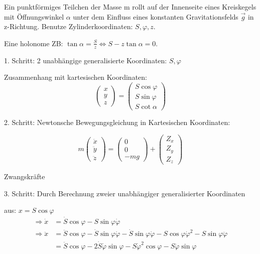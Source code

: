 \documentclass[10pt, letterpaper]{article}
\begin{document}
Ein punktförmiges Teilchen der Masse m rollt auf der Innenseite eines Kreiskegels mit Öffnungswinkel $\alpha$ unter dem Einfluss eines konstanten Gravitationsfelds $\vec{g}$ in z-Richtung. Benutze Zylinderkoordinaten: $S,\varphi,z$.

Eine holonome ZB: $\tan \alpha = \frac{S}{z} \Leftrightarrow S-z\tan\alpha = 0$.

1. Schritt: 2 unabhängige generalisierte Koordinaten: $S,\varphi$

Zusammenhang mit kartesischen Koordinaten:
\[
\begin{pmatrix} 
x \\ y \\ z
\end{pmatrix} = 
\begin{pmatrix}
S \cos\varphi \\ S \sin\varphi \\ S \cot\alpha
\end{pmatrix}
\]

2. Schritt: Newtonsche Bewegungsgleichung in Kartesischen Koordinaten:

\[
m\begin{pmatrix}
\ddot{x} \\ \ddot{y} \\ \ddot{z}
\end{pmatrix} = 
\begin{pmatrix}
0 \\ 0 \\ -mg
\end{pmatrix} + 
\begin{pmatrix}
Z_x \\ Z_y \\ Z_z
\end{pmatrix}
\]
\begin{flushright}
Zwangskräfte
\end{flushright}


3. Schritt: Durch Berechnung zweier unabhängiger generalisierter Koordinaten

aus: $x = S\cos\varphi$
\[\begin{aligned}
\Rightarrow \dot{x} &= \dot{S}\cos\varphi - S\sin\varphi\dot{\varphi} \\
\Rightarrow \ddot{x} &= \ddot{S}\cos\varphi - \dot{S}\sin\varphi\dot{\varphi} - \dot{S}\sin\varphi\dot{\varphi} - S\cos\varphi\dot{\varphi}^2 - S\sin\varphi\ddot{\varphi} \\
&= \ddot{S}\cos\varphi - 2\dot{S}\dot{\varphi}\sin\varphi - S\dot{\varphi}^2\cos\varphi - S\ddot{\varphi}\sin\varphi
\end{aligned}\]
\end{document}
